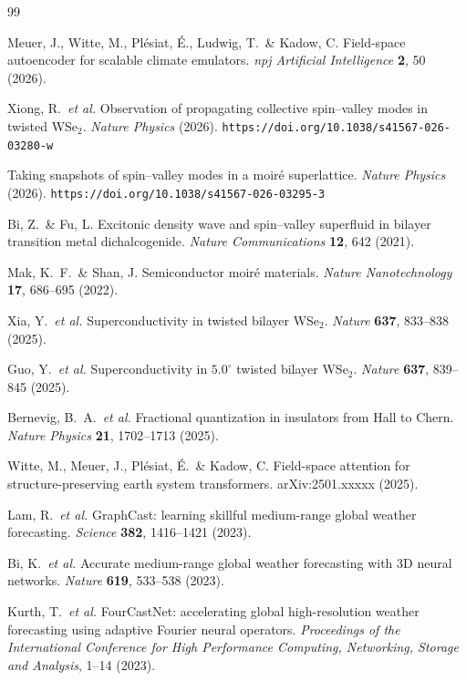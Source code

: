 \documentclass[11pt,a4paper]{article}
\theoremstyle{plain}
\theoremstyle{definition}
\theoremstyle{remark}
\begin{document}
\begin{thebibliography}{99}

Meuer, J., Witte, M., Pl\'{e}siat, \'{E}., Ludwig, T.\ \& Kadow, C.
Field-space autoencoder for scalable climate emulators.
\textit{npj Artificial Intelligence} \textbf{2}, 50 (2026).

Xiong, R.\ \textit{et al.}
Observation of propagating collective spin--valley modes in twisted WSe$_2$.
\textit{Nature Physics} (2026).
\texttt{https://doi.org/10.1038/s41567-026-03280-w}

Taking snapshots of spin--valley modes in a moir\'{e} superlattice.
\textit{Nature Physics} (2026).
\texttt{https://doi.org/10.1038/s41567-026-03295-3}

Bi, Z.\ \& Fu, L.
Excitonic density wave and spin--valley superfluid in bilayer transition
metal dichalcogenide.
\textit{Nature Communications} \textbf{12}, 642 (2021).

Mak, K.~F.\ \& Shan, J.
Semiconductor moir\'{e} materials.
\textit{Nature Nanotechnology} \textbf{17}, 686--695 (2022).

Xia, Y.\ \textit{et al.}
Superconductivity in twisted bilayer WSe$_2$.
\textit{Nature} \textbf{637}, 833--838 (2025).

Guo, Y.\ \textit{et al.}
Superconductivity in $5.0^\circ$ twisted bilayer WSe$_2$.
\textit{Nature} \textbf{637}, 839--845 (2025).

Bernevig, B.~A.\ \textit{et al.}
Fractional quantization in insulators from Hall to Chern.
\textit{Nature Physics} \textbf{21}, 1702--1713 (2025).

Witte, M., Meuer, J., Pl\'{e}siat, \'{E}.\ \& Kadow, C.
Field-space attention for structure-preserving earth system transformers.
arXiv:2501.xxxxx (2025).

Lam, R.\ \textit{et al.}
GraphCast: learning skillful medium-range global weather forecasting.
\textit{Science} \textbf{382}, 1416--1421 (2023).

Bi, K.\ \textit{et al.}
Accurate medium-range global weather forecasting with 3D neural networks.
\textit{Nature} \textbf{619}, 533--538 (2023).

Kurth, T.\ \textit{et al.}
FourCastNet: accelerating global high-resolution weather forecasting using
adaptive Fourier neural operators.
\textit{Proceedings of the International Conference for High Performance
Computing, Networking, Storage and Analysis}, 1--14 (2023).


\end{thebibliography}
\end{document}
